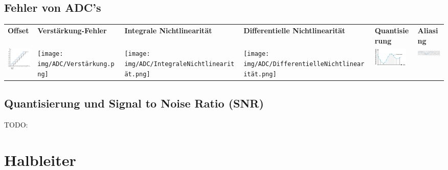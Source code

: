 \documentclass[margin=normal]{tex/hsrzf}
\begin{document}
\subsection{Fehler von ADC's}
\begin{tabularx}{\textwidth}{p{}p{}p{}p{}p{}p{}}
  \textbf{Offset}
   &
  \textbf{Verstärkung-\newline Fehler}
   &
  \textbf{Integrale \newline Nichtlinearität}
   &
  \textbf{Differentielle Nichtlinearität}
   &
  \textbf{Quantisierung}
   &
  \textbf{Aliasing}
  \\
  \includegraphics[width = 1.6cm]{img/ADC/OffsetFehler.png}
   &
  \texttt{[image: img/ADC/Verstärkung.png]}
   &
  \texttt{[image: img/ADC/IntegraleNichtlinearität.png]}
   &
  \texttt{[image: img/ADC/DifferentielleNichtlinearität.png]}
   &
  \includegraphics[width = 1.6cm]{img/ADC/Quantisierungsfehler.png}
   &
  \includegraphics[width = 1.6cm]{img/ADC/Aliasing.png}
\end{tabularx}

\subsection{Quantisierung und Signal to Noise Ratio (SNR)}
{\huge TODO:} %
\normalsize

\section{Halbleiter}
\end{document}
